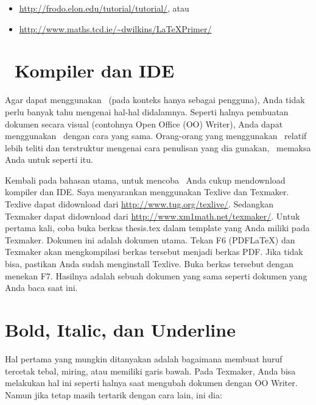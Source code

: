 \begin{itemize}
	\item \url{http://frodo.elon.edu/tutorial/tutorial/}, atau
	\item \url{http://www.maths.tcd.ie/~dwilkins/LaTeXPrimer/}
\end{itemize}


\section{\latex~Kompiler dan IDE}
Agar dapat menggunakan \latex~(pada konteks hanya sebagai pengguna), Anda 
tidak perlu banyak tahu mengenai hal-hal didalamnya. 
Seperti halnya pembuatan dokumen secara visual (contohnya Open Office (OO) 
Writer), Anda dapat menggunakan \latex~dengan cara yang sama. 
Orang-orang yang menggunakan \latex~relatif lebih teliti dan terstruktur 
mengenai cara penulisan yang dia gunakan, \latex~memaksa Anda untuk seperti 
itu.  

Kembali pada bahasan utama, untuk mencoba \latex~Anda cukup mendownload 
kompiler dan IDE. Saya menyarankan menggunakan Texlive dan Texmaker. 
Texlive dapat didownload dari \url{http://www.tug.org/texlive/}. 
Sedangkan Texmaker dapat didownload dari 
\url{http://www.xm1math.net/texmaker/}. 
Untuk pertama kali, coba buka berkas thesis.tex dalam template yang Anda miliki 
pada Texmaker. 
Dokumen ini adalah dokumen utama. 
Tekan F6 (PDFLaTeX) dan Texmaker akan mengkompilasi berkas tersebut menjadi 
berkas PDF. 
Jika tidak bisa, pastikan Anda sudah menginstall Texlive. 
Buka berkas tersebut dengan menekan F7. 
Hasilnya adalah sebuah dokumen yang sama seperti dokumen yang Anda baca saat 
ini. 


\section{Bold, Italic, dan Underline}
Hal pertama yang mungkin ditanyakan adalah bagaimana membuat huruf tercetak 
tebal, miring, atau memiliki garis bawah. 
Pada Texmaker, Anda bisa melakukan hal ini seperti halnya saat mengubah dokumen 
dengan OO Writer. 
Namun jika tetap masih tertarik dengan cara lain, ini dia: 

